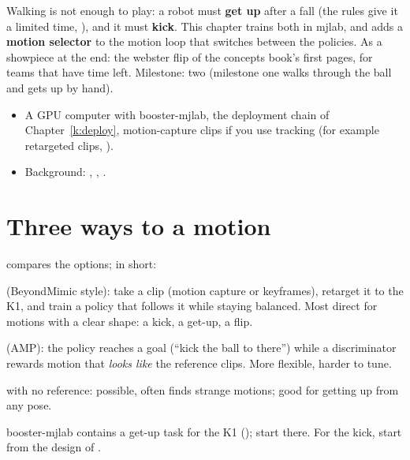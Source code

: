 \label{k:train}

Walking is not enough to play: a robot must \textbf{get up} after a fall (the rules give it a limited time, ), and it must \textbf{kick}. This chapter trains both in mjlab, and adds a \textbf{motion selector} to the motion loop that switches between the policies. As a showpiece at the end: the webster flip of the concepts book's first pages, for teams that have time left. Milestone: two (milestone one walks through the ball and gets up by hand).

\begin{needbox}
\begin{itemize}[nosep]
  \item A GPU computer with booster-mjlab, the deployment chain of Chapter~\ref{k:deploy}, motion-capture clips if you use tracking (for example retargeted clips, ).
  \item Background: , , .
\end{itemize}
\end{needbox}

\section*{Three ways to a motion}
 compares the options; in short:
\begin{description}[leftmargin=0.6cm]
  \item[Tracking a reference] (BeyondMimic style): take a clip (motion capture or keyframes), retarget it to the K1, and train a policy that follows it while staying balanced. Most direct for motions with a clear shape: a kick, a get-up, a flip.
  \item[Style reward] (AMP): the policy reaches a goal (``kick the ball to there'') while a discriminator rewards motion that \emph{looks like} the reference clips. More flexible, harder to tune.
  \item[Pure reward] with no reference: possible, often finds strange motions; good for getting up from any pose.
\end{description}
booster-mjlab contains a get-up task for the K1\guess{} (); start there. For the kick, start from the design of .

